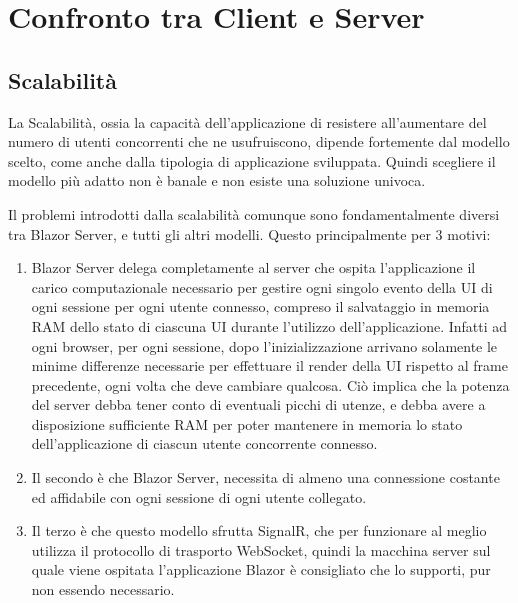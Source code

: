 \chapter{Confronto tra Client e Server}\label{cap:scalprocont}
\section{Scalabilit\`a}\label{sez:scalabilita}
La Scalabilit\`a, ossia la capacit\`a dell'applicazione di resistere all'aumentare del numero di utenti concorrenti che ne usufruiscono, dipende fortemente dal modello scelto, come anche dalla tipologia di applicazione sviluppata.
Quindi scegliere il modello pi\`u adatto non \`e banale e non esiste una soluzione univoca.

Il problemi introdotti dalla scalabilit\`a comunque sono fondamentalmente diversi tra Blazor Server, e tutti gli altri modelli.
Questo principalmente per 3 motivi:
\begin{enumerate}
	\item Blazor Server delega completamente al server che ospita l'applicazione il carico computazionale necessario per gestire ogni singolo evento della UI di ogni sessione per ogni utente connesso, compreso il salvataggio in memoria RAM dello stato di ciascuna UI durante l'utilizzo dell'applicazione.
	Infatti ad ogni browser, per ogni sessione, dopo l'inizializzazione arrivano solamente le minime differenze necessarie per effettuare il render della UI rispetto al frame precedente, ogni volta che deve cambiare qualcosa.
	Ci\`o implica che la potenza del server debba tener conto di eventuali picchi di utenze, e debba avere a disposizione sufficiente RAM per poter mantenere in memoria lo stato dell'applicazione di ciascun utente concorrente connesso.
	
	\item Il secondo \`e che Blazor Server, necessita di almeno una connessione costante ed affidabile con ogni sessione di ogni utente collegato.
	
	\item Il terzo \`e che questo modello sfrutta SignalR, che per funzionare al meglio utilizza il protocollo di trasporto WebSocket, quindi la macchina server sul quale viene ospitata l'applicazione Blazor \`e consigliato che lo supporti, pur non essendo necessario.
\end{enumerate}


